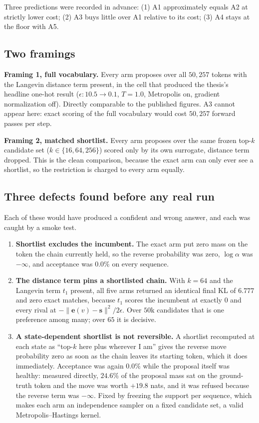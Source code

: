 \documentclass[11pt,a4paper]{article}
\newcommand{\ve}{\bm{e}}
\newcommand{\vs}{\bm{s}}
\begin{document}
Three predictions were recorded in advance: (1) A1 approximately equals A2 at strictly
lower cost; (2) A3 buys little over A1 relative to its cost; (3) A4 stays at the floor
with A5.

\subsection{Two framings}

\textbf{Framing 1, full vocabulary.} Every arm proposes over all $50{,}257$ tokens with
the Langevin distance term present, in the cell that produced the thesis's headline
one-hot result ($\epsilon: 10.5 \to 0.1$, $T=1.0$, Metropolis on, gradient normalization
off). Directly comparable to the published figures. A3 cannot appear here: exact scoring
of the full vocabulary would cost $50{,}257$ forward passes per step.

\textbf{Framing 2, matched shortlist.} Every arm proposes over the same frozen top-$k$
candidate set ($k \in \{16,64,256\}$) scored only by its own surrogate, distance term
dropped. This is the clean comparison, because the exact arm can only ever see a
shortlist, so the restriction is charged to every arm equally.

\subsection{Three defects found before any real run}

Each of these would have produced a confident and wrong answer, and each was caught by a
smoke test.

\begin{enumerate}
\item \textbf{Shortlist excludes the incumbent.} The exact arm put zero mass on the token
  the chain currently held, so the reverse probability was zero, $\log\alpha$ was
  $-\infty$, and acceptance was $0.0\%$ on every sequence.
\item \textbf{The distance term pins a shortlisted chain.} With $k=64$ and the Langevin
  term $t_1$ present, all five arms returned an identical final KL of $6.777$ and zero
  exact matches, because $t_1$ scores the incumbent at exactly $0$ and every rival at
  $-\lVert \ve(v)-\vs \rVert^2 / 2\epsilon$. Over $50$k candidates that is one preference
  among many; over $65$ it is decisive.
\item \textbf{A state-dependent shortlist is not reversible.} A shortlist recomputed at
  each state as ``top-$k$ here plus wherever I am'' gives the reverse move probability
  zero as soon as the chain leaves its starting token, which it does immediately.
  Acceptance was again $0.0\%$ while the proposal itself was healthy: measured directly,
  $24.6\%$ of the proposal mass sat on the ground-truth token and the move was worth
  $+19.8$ nats, and it was refused because the reverse term was $-\infty$. Fixed by
  freezing the support per sequence, which makes each arm an independence sampler on a
  fixed candidate set, a valid Metropolis--Hastings kernel.
\end{enumerate}
\end{document}
